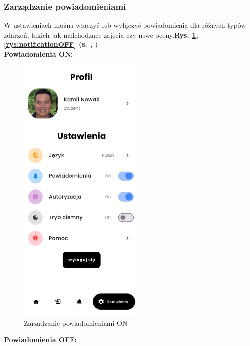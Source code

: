\subsubsection{Zarządzanie powiadomieniami}
W ustawieniach można włączyć lub wyłączyć powiadomienia dla różnych typów zdarzeń, takich jak nadchodzące zajęcia czy nowe oceny.\textbf{Rys. \ref{rys:notificationON}, \ref{rys:notificationOFF} (s. \pageref{rys:notificationON}, \pageref{rys:notificationOFF})}
\\\textbf{Powiadomienia ON:}
\begin{figure}[h!]
	\centering
	\includegraphics[width=0.55\textwidth]{rys/biometricssONN.png}
	\caption{Zarządzanie powiadomieniami ON}
	\label{rys:notificationON}
\end{figure}
\newpage
\textbf{Powiadomienia OFF:}
